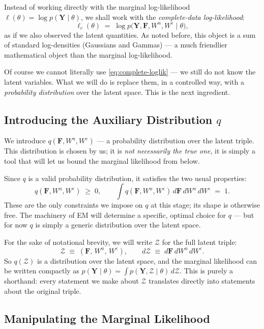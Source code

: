 \documentclass[11pt, a4paper, oneside]{article}
\newcommand{\mY}{\mathbf{Y}}
\newcommand{\mF}{\mathbf{F}}
\begin{document}
Instead of working directly with the marginal log-likelihood
$\ell(\theta) = \log p(\mY \mid \theta)$, we shall work with the
\emph{complete-data log-likelihood}:
\begin{equation}
\ell_c(\theta) \;=\; \log p\big(\mY, \mF, W^u, W^\varepsilon \mid \theta\big),
\label{eq:complete-loglik}
\end{equation}
as if we also observed the latent quantities. As noted before, this object is a sum of standard log-densities
(Gaussians and Gammas) — a much friendlier mathematical object than the
marginal log-likelihood.

Of course we cannot literally use \eqref{eq:complete-loglik} — we still do
not know the latent variables. What we will do is replace them, in a
controlled way, with a \emph{probability distribution} over the latent
space. This is the next ingredient.

\subsection{Introducing the Auxiliary Distribution $q$}

We introduce $q(\mF, W^u, W^\varepsilon)$ — a probability distribution
over the latent triple. This distribution is chosen by us; it is \emph{not
necessarily the true one}, it is simply a tool that will let us bound the
marginal likelihood from below.

Since $q$ is a valid probability distribution, it satisfies the two usual
properties:
\[
q(\mF, W^u, W^\varepsilon) \;\geq\; 0,
\qquad
\int q(\mF, W^u, W^\varepsilon)\, d\mF\, dW^u\, dW^\varepsilon \;=\; 1.
\]
These are the only constraints we impose on $q$ at this stage; its shape
is otherwise free. The machinery of EM will determine a specific, optimal
choice for $q$ — but for now $q$ is simply a generic distribution over
the latent space.

For the sake of notational brevity, we will write $\mathcal{Z}$ for the
full latent triple:
\[
\mathcal{Z} \;\equiv\; (\mF,\, W^u,\, W^\varepsilon),
\qquad
d\mathcal{Z} \;\equiv\; d\mF\, dW^u\, dW^\varepsilon.
\]
So $q(\mathcal{Z})$ is a distribution over the latent space, and the
marginal likelihood can be written compactly as
$p(\mY \mid \theta) = \int p(\mY, \mathcal{Z} \mid \theta)\, d\mathcal{Z}$.
This is purely a shorthand: every statement we make about $\mathcal{Z}$
translates directly into statements about the original triple.

\subsection{Manipulating the Marginal Likelihood}
\end{document}
